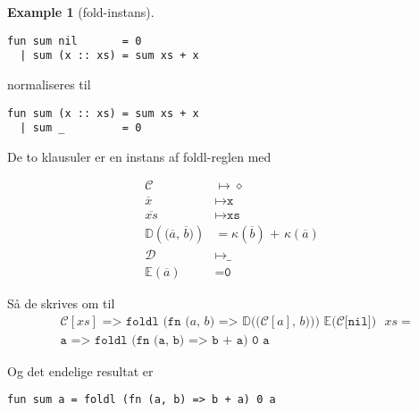 \documentclass[oneside]{memoir}
\theoremstyle{definition}
\newtheorem{example}{Example}
\begin{document}
\begin{example}[\textsf{fold}-instans]\
\begin{verbatim}
fun sum nil       = 0
  | sum (x :: xs) = sum xs + x
\end{verbatim}

normaliseres til

\begin{verbatim}
fun sum (x :: xs) = sum xs + x
  | sum _         = 0
\end{verbatim}

De to klausuler er en instans af \textsf{foldl}-reglen med

\begin{align}
  \mathcal{C} &\mapsto \diamond\\
  \overline{x} &\mapsto \texttt{x}\\
  \overline{xs} &\mapsto \texttt{xs}\\
  \mathbb{D}(\texttt{($\overline{a}$, $\overline{b}$)}) &=
  \kappa(\overline{b}) \texttt{ + } \kappa(\overline{a})\\
  \mathcal{D} &\mapsto \texttt{\_}\\
  \mathbb{E}(\overline{a}) &= \texttt{0}
\end{align}

Så de skrives om til
  \begin{align}
    &\texttt{$\mathcal{C}[xs]$ => foldl (fn ($a$, $b$) =>
      $\mathbb{D}($($\mathcal{C}[a]$, $b$)$)$) $\mathbb{E}(\mathcal{C}[$nil$])$ $xs$} =\\
    &\texttt{a => foldl (fn (a, b) => b + a) 0 a}
  \end{align}

Og det endelige resultat er

\begin{verbatim}
fun sum a = foldl (fn (a, b) => b + a) 0 a
\end{verbatim}







\end{example}
\end{document}
